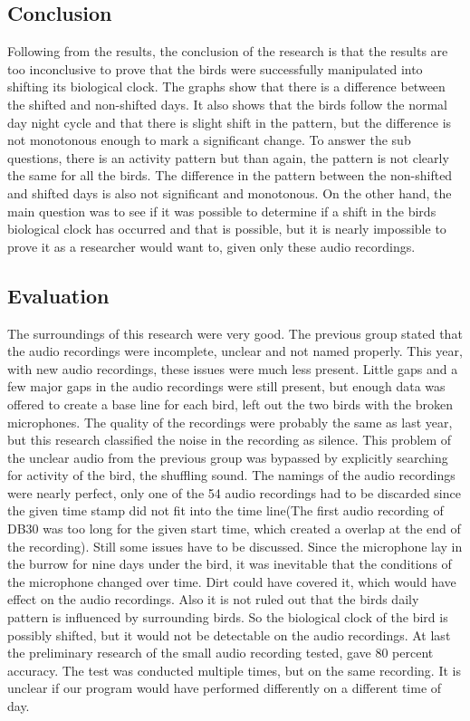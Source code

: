 \documentclass[a4paper]{article}
\begin{document}
    \subsection*{Conclusion}
        Following from the results, the conclusion of the research is that the results are too inconclusive to prove that the birds were successfully manipulated into shifting its biological clock. The graphs show that there is a difference between the shifted and non-shifted days. It also shows that the birds follow the normal day night cycle and that there is slight shift in the pattern, but the difference is not monotonous enough to mark a significant change. To answer the sub questions, there is an activity pattern but than again, the pattern is not clearly the same for all the birds. The difference in the pattern between the non-shifted and shifted days is also not significant and monotonous. On the other hand, the main question was to see if it was possible to determine if a shift in the birds biological clock has occurred and that is possible, but it is nearly impossible to prove it as a researcher would want to, given only these audio recordings.
    \subsection*{Evaluation}
        The surroundings of this research were very good. The previous group stated that the audio recordings were incomplete, unclear and not named properly. This year, with new audio recordings, these issues were much less present. Little gaps and a few major gaps in the audio recordings were still present, but enough data was offered to create a base line for each bird, left out the two birds with the broken microphones. The quality of the recordings were probably the same as last year, but this research classified the noise in the recording as silence. This problem of the unclear audio from the previous group was bypassed by explicitly searching for activity of the bird, the shuffling sound. The namings of the audio recordings were nearly perfect, only one of the 54 audio recordings had to be discarded since the given time stamp did not fit into the time line(The first audio recording of DB30 was too long for the given start time, which created a overlap at the end of the recording). Still some issues have to be discussed. Since the microphone lay in the burrow for nine days under the bird, it was inevitable that the conditions of the microphone changed over time. Dirt could have covered it, which would have effect on the audio recordings. Also it is not ruled out that the birds daily pattern is influenced by surrounding birds. So the biological clock of the bird is possibly shifted, but it would not be detectable on the audio recordings. At last the preliminary research of the small audio recording tested, gave 80 percent accuracy. The test was conducted multiple times, but on the same recording. It is unclear if our program would have performed differently on a different time of day.
\end{document}
